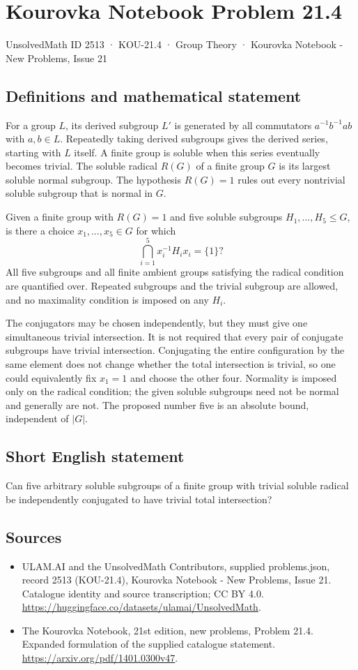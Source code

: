 \documentclass[11pt,a4paper]{article}
\begin{document}
\section*{Kourovka Notebook Problem 21.4}\label{2513}
{\small UnsolvedMath ID 2513 · KOU-21.4 · Group Theory · Kourovka Notebook - New Problems, Issue 21}
\subsection{Definitions and mathematical statement}
For a group $L$, its derived subgroup $L'$ is generated by all
commutators $a^{-1}b^{-1}ab$ with $a,b\in L$. Repeatedly taking derived
subgroups gives the derived series, starting with $L$ itself.
A finite group is soluble when this series eventually becomes trivial.
The soluble radical $R(G)$ of a finite group $G$ is its largest soluble
normal subgroup. The hypothesis $R(G)=1$ rules out every nontrivial
soluble subgroup that is normal in $G$.

Given a finite group with $R(G)=1$ and five soluble subgroups
$H_1,\ldots,H_5\le G$, is there a choice $x_1,\ldots,x_5\in G$ for which
\[
 \bigcap_{i=1}^{5}x_i^{-1}H_i x_i=\{1\}?
\]
All five subgroups and all finite ambient groups satisfying the radical
condition are quantified over. Repeated subgroups and the trivial subgroup
are allowed, and no maximality condition is imposed on any $H_i$.

The conjugators may be chosen independently, but they must give one
simultaneous trivial intersection. It is not required that every pair
of conjugate subgroups have trivial intersection. Conjugating the entire
configuration by the same element does not change whether the total
intersection is trivial, so one could equivalently fix $x_1=1$ and
choose the other four. Normality is imposed only on the radical condition;
the given soluble subgroups need not be normal and generally are not.
The proposed number five is an absolute bound, independent of $|G|$.
\subsection{Short English statement}
Can five arbitrary soluble subgroups of a finite group with trivial soluble radical be independently conjugated to have trivial total intersection?
\subsection{Sources}
\begin{itemize}
\item[S1] ULAM.AI and the UnsolvedMath Contributors, supplied problems.json, record 2513 (KOU-21.4), Kourovka Notebook - New Problems, Issue 21. Catalogue identity and source transcription; CC BY 4.0.
\url{https://huggingface.co/datasets/ulamai/UnsolvedMath}.
\item[S2] The Kourovka Notebook, 21st edition, new problems, Problem 21.4. Expanded formulation of the supplied catalogue statement.
\url{https://arxiv.org/pdf/1401.0300v47}.
\end{itemize}
\end{document}
